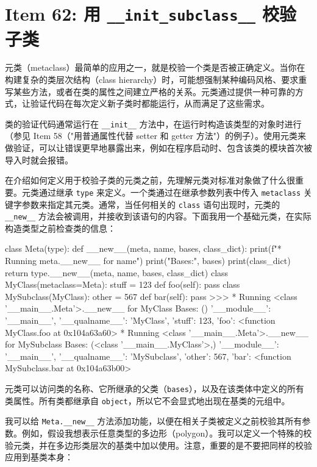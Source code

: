 \section{Item 62: 用 \texttt{\_\_init\_subclass\_\_} 校验子类}

元类（metaclass）最简单的应用之一，就是校验一个类是否被正确定义。当你在构建复杂的类层次结构（class hierarchy）时，可能想强制某种编码风格、要求重写某些方法，或者在类的属性之间建立严格的关系。元类通过提供一种可靠的方式，让验证代码在每次定义新子类时都能运行，从而满足了这些需求。

类的验证代码通常运行在 \texttt{\_\_init\_\_} 方法中，在运行时构造该类型的对象时进行（参见 Item 58（"用普通属性代替 setter 和 getter 方法"）的例子）。使用元类来做验证，可以让错误更早地暴露出来，例如在程序启动时、包含该类的模块首次被导入时就会报错。

在介绍如何定义用于校验子类的元类之前，先理解元类对标准对象做了什么很重要。元类通过继承 \texttt{type} 来定义。一个类通过在继承参数列表中传入 \texttt{metaclass} 关键字参数来指定其元类。通常，当任何相关的 \texttt{class} 语句出现时，元类的 \texttt{\_\_new\_\_} 方法会被调用，并接收到该语句的内容。下面我用一个基础元类，在实际构造类型之前检查类的信息：

\begin{codebox}[python]
class Meta(type):
    def __new__(meta, name, bases, class_dict):
        print(f"* Running {meta}.__new__ for {name}")
        print("Bases:", bases)
        print(class_dict)
        return type.__new__(meta, name, bases, class_dict)
class MyClass(metaclass=Meta):
    stuff = 123
    def foo(self):
        pass
class MySubclass(MyClass):
    other = 567
    def bar(self):
        pass
>>>
* Running <class '__main__.Meta'>.__new__ for MyClass
Bases: ()
{'__module__': '__main__',
 '__qualname__': 'MyClass',
 'stuff': 123,
 'foo': <function MyClass.foo at 0x104a63a60>}
* Running <class '__main__.Meta'>.__new__ for MySubclass
Bases: (<class '__main__.MyClass'>,)
{'__module__': '__main__',
 '__qualname__': 'MySubclass',
 'other': 567,
 'bar': <function MySubclass.bar at 0x104a63b00>}
\end{codebox}

元类可以访问类的名称、它所继承的父类（\texttt{bases}），以及在该类体中定义的所有类属性。所有类都继承自 \texttt{object}，所以它不会显式地出现在基类的元组中。

我可以给 \texttt{Meta.\_\_new\_\_} 方法添加功能，以便在相关子类被定义之前校验其所有参数。例如，假设我想表示任意类型的多边形（polygon）。我可以定义一个特殊的校验元类，并在多边形类层次的基类中加以使用。注意，重要的是不要把同样的校验应用到基类本身：

